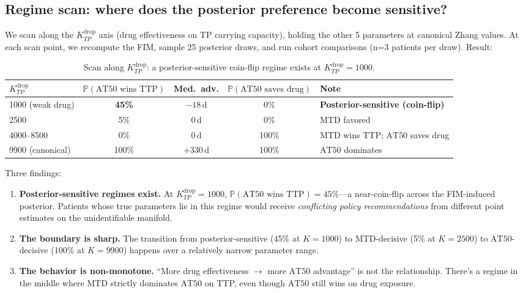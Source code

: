 \documentclass[11pt]{article}
\newcommand{\Prob}{\mathbb{P}}
\newcommand{\TTP}{\mathrm{TTP}}
\newcommand{\AT}{\mathrm{AT}}
\newcommand{\Kdrop}{K_{TP}^{\text{drop}}}
\begin{document}
\subsection{Regime scan: where does the posterior preference become sensitive?}\label{sec:regime_scan}

We scan along the $\Kdrop$ axis (drug effectiveness on TP carrying capacity),
holding the other 5 parameters at canonical Zhang values. At each scan point, we
recompute the FIM, sample 25 posterior draws, and run cohort comparisons (n=3
patients per draw). Result:

\begin{table}[h]
\centering
\begin{tabular}{lcccl}
\toprule
$\Kdrop$ & $\Prob(\AT 50 \text{ wins } \TTP)$ & Med.\ adv. & $\Prob(\AT 50 \text{ saves drug})$ & Note \\
\midrule
1000 (weak drug) & \textbf{45\%} & $-18$\,d & 0\% & \textbf{Posterior-sensitive (coin-flip)} \\
2500 & 5\% & 0\,d & 0\% & MTD favored \\
4000--8500 & 0\% & 0\,d & 100\% & MTD wins TTP; $\AT 50$ saves drug \\
9900 (canonical) & 100\% & $+330$\,d & 100\% & $\AT 50$ dominates \\
\bottomrule
\end{tabular}
\caption{Scan along $\Kdrop$: a posterior-sensitive coin-flip regime exists at
$\Kdrop = 1000$.}
\end{table}

Three findings:

\begin{enumerate}
\item \textbf{Posterior-sensitive regimes exist.} At $\Kdrop = 1000$,
$\Prob(\AT 50 \text{ wins } \TTP) = 45\%$---a near-coin-flip across the
FIM-induced posterior. Patients whose true parameters lie in this regime would
receive \emph{conflicting policy recommendations} from different point estimates
on the unidentifiable manifold.
\item \textbf{The boundary is sharp.} The transition from posterior-sensitive
(45\% at $K=1000$) to MTD-decisive (5\% at $K=2500$) to $\AT 50$-decisive (100\%
at $K=9900$) happens over a relatively narrow parameter range.
\item \textbf{The behavior is non-monotone.} ``More drug effectiveness $\to$
more $\AT 50$ advantage'' is not the relationship. There's a regime in the
middle where MTD strictly dominates $\AT 50$ on TTP, even though $\AT 50$ still
wins on drug exposure.
\end{enumerate}
\end{document}
